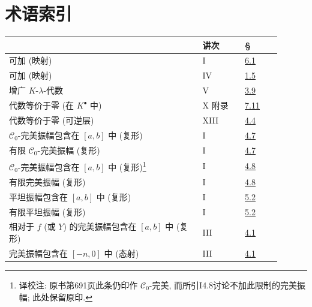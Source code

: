 
\newpage
{}\section*{术语索引}
\begingroup\small
\begin{longtable}{@{}>{\raggedright\arraybackslash}p{0.64\linewidth}>{\raggedright\arraybackslash}p{0.14\linewidth}>{\raggedright\arraybackslash}p{0.12\linewidth}@{}}
\toprule
 & 讲次 & §\\
\midrule
\endhead
可加 (映射) & I & \hyperlink{sga6.e01.def.6-1}{6.1}\\
可加 (映射) & IV & \hyperlink{sga6.e04.para.1-5}{1.5}\\
增广 \(K\)-\(\lambda\)-代数 & V & \hyperlink{sga6.e05.def.3-9}{3.9}\\
代数等价于零 (在 \(K^\bullet\) 中) & X 附录 & \hyperlink{sga6.e10.para.7-11}{7.11}\\
代数等价于零 (可逆层) & XIII & \hyperlink{sga6.e13.para.4-4}{4.4}\\
\(\mathcal C_0\)-完美振幅包含在 \([a,b]\) 中 (复形) & I & \hyperlink{sga6.e01.def.4-7}{4.7}\\
有限 \(\mathcal C_0\)-完美振幅 (复形) & I & \hyperlink{sga6.e01.def.4-7}{4.7}\\
\(\mathcal C_0\)-完美振幅包含在 \([a,b]\) 中 (复形)\footnote{译校注: 原书第691页此条仍印作 $\mathcal C_0$-完美, 而所引I4.8讨论不加此限制的完美振幅; 此处保留原印.} & I & \hyperlink{sga6.e01.ex.4-8}{4.8}\\
有限完美振幅 (复形) & I & \hyperlink{sga6.e01.ex.4-8}{4.8}\\
平坦振幅包含在 \([a,b]\) 中 (复形) & I & \hyperlink{sga6.e01.def.5-2}{5.2}\\
有限平坦振幅 (复形) & I & \hyperlink{sga6.e01.def.5-2}{5.2}\\
相对于 \(f\) (或 \(Y\)) 的完美振幅包含在 \([a,b]\) 中 (复形) & III & \hyperlink{sga6.e03.def.4-1}{4.1}\\
完美振幅包含在 \([-n,0]\) 中 (态射) & III & \hyperlink{sga6.e03.def.4-1}{4.1}\\

\end{longtable}
